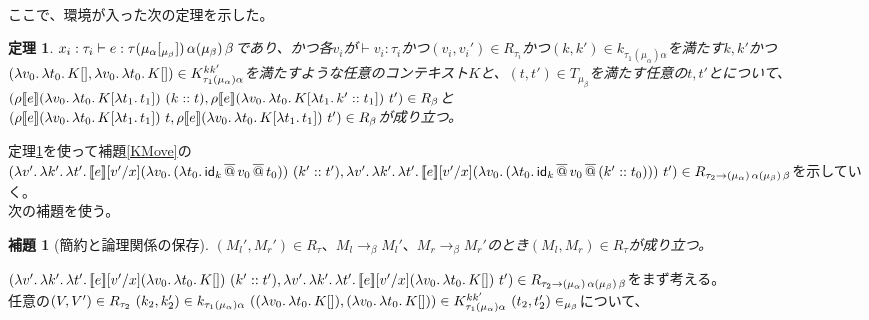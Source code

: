 \documentclass[japanese,draft]{jssst_ppl} %
\newtheorem{lemma}[definition]{補題}
\newtheorem{theorem}[definition]{定理}
\begin{document}
\\
ここで、環境が入った次の定理を示した。
\begin{theorem}
  $x_i:\tau_i \vdash e:\tau \TrailsType{\alpha}{\beta} \TrailType{\beta}$であり、かつ各$v_i$が$\vdash v_i:\tau_i$かつ$(v_i,v_i') \in R_{\tau_i}$かつ$(k,k')\in k_{\tau_1(\mu_{\alpha})\alpha}$を満たす$k,k'$かつ$(\Lam{v_0}{\Lam{t_0}{K[]}}, \Lam{v_0}{\Lam{t_0}{K[]}})\in  K^{kk'}_{\tau_1(\mu_{\alpha})\alpha}$を満たすような任意のコンテキスト$K$と、$(t, t') \in T_{\mu_{\beta}}$を満たす任意の$t, t'$とについて、\\
  $(\rho \CPSTh{e} \LamP{v_0}{\Lam{t_0}{K[\Lam{t_1}{t_1}]}}\ \ConsP{k}{t}, \rho \CPSTh{e} \LamP{v_0}{\Lam{t_0}{K[\Lam{t_1}{\Cons{k'}{t_1}}]}}\ t')\in R_{\beta}$と\\
  $(\rho \CPSTh{e} \LamP{v_0}{\Lam{t_0}{K[\Lam{t_1}{t_1}]}}\ t, \rho \CPSTh{e} \LamP{v_0}{\Lam{t_0}{K[\Lam{t_1}{t_1}]}}\ t')\in R_{\beta}$が成り立つ。
\label{HandMain}
\end{theorem}
定理\ref{HandMain}を使って補題\ref{KMove}の\\
$(\Lam{v'}{\Lam{k'}{\Lam{t'}{\CPSTh{e}[\Change{x}{v'}] \LamP{v_0}{\LamP{t_0}{\SApp{\Idk}{\SApp{v_0}{t_0}}}}\ \ConsP{k'}{t'}}}},\\
\Lam{v'}{\Lam{k'}{\Lam{t'}{\CPSTh{e}[\Change{x}{v'}] \LamP{v_0}{\LamP{t_0}{\SApp{\Idk}{\SApp{v_0}{\ConsP{k'}{t_0}}}}}\ t'}}})
\in R_{\tau_2 \rightarrow \TrailType{\alpha} \TrailType{\beta}}$を示していく。\\
次の補題を使う。\\
\begin{lemma}[簡約と論理関係の保存]
  $(M_l', M_r') \in R_{\tau}、M_l \rightarrow_{\beta} M_l'、M_r \rightarrow_{\beta} M_r'$のとき$(M_l, M_r) \in R_{\tau}$が成り立つ。
\label{Reduction2}
\end{lemma}
$(\Lam{v'}{\Lam{k'}{\Lam{t'}{\CPSTh{e}[\Change{x}{v'}] \LamP{v_0}{\Lam{t_0}{K[]}}\ \ConsP{k'}{t'}}}},\\
\Lam{v'}{\Lam{k'}{\Lam{t'}{\CPSTh{e}[\Change{x}{v'}] \LamP{v_0}{\Lam{t_0}{K[]}}\ t'}}})
\in R_{\tau_2 \rightarrow \TrailType{\alpha} \TrailType{\beta}}$をまず考える。
\\
任意の$(V,V')\in R_{\tau_2}\  (k_2,k_2')\in k_{\tau_1(\mu_{\alpha})\alpha}\  (\LamP{v_0}{\Lam{t_0}{K[]}},\LamP{v_0}{\Lam{t_0}{K[]}})\in K^{kk'}_{\tau_1(\mu_{\alpha})\alpha}\  (t_2,t_2')\in_{\mu_{\beta}}$について、\\
\end{document}
